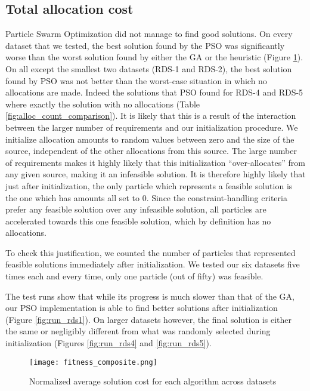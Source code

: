 \documentclass{sig-alternate}
\begin{document}
\subsection{Total allocation cost}\label{sec:results_solutioncost}
Particle Swarm Optimization did not manage to find good solutions. On every dataset that we tested, the best solution found by the PSO was significantly worse than the worst solution found by either the GA or the heuristic (Figure \ref{fig:fitness_comparison}). On all except the smallest two datasets (RDS-1 and RDS-2), the best solution found by PSO was not better than the worst-case situation in which no allocations are made. Indeed the solutions that PSO found for RDS-4 and RDS-5 where exactly the solution with no allocations (Table \ref{fig:alloc_count_comparison}). It is likely that this is a result of the interaction between the larger number of requirements and our initialization procedure. We initialize allocation amounts to random values between zero and the size of the source, independent of the other allocations from this source. The large number of requirements makes it highly likely that this initialization ``over-allocates'' from any given source, making it an infeasible solution. It is therefore highly likely that just after initialization, the only particle which represents a feasible solution is the one which has amounts all set to 0. Since the constraint-handling criteria prefer any feasible solution over any infeasible solution, all particles are accelerated towards this one feasible solution, which by definition has no allocations.

To check this justification, we counted the number of particles that represented feasible solutions immediately after initialization. We tested our six datasets five times each and every time, only one particle (out of fifty) was feasible.

The test runs show that while its progress is much slower than that of the GA, our PSO implementation is able to find better solutions after initialization (Figure \ref{fig:run_rds1}). On larger datasets however, the final solution is either the same or negligibly different from what was randomly selected during initialization (Figures \ref{fig:run_rds4} and \ref{fig:run_rds5}).

\begin{figure}
	\texttt{[image: fitness\_composite.png]}
	\caption{Normalized average solution cost for each algorithm across datasets}
	\label{fig:fitness_comparison}
\end{figure}
\end{document}

